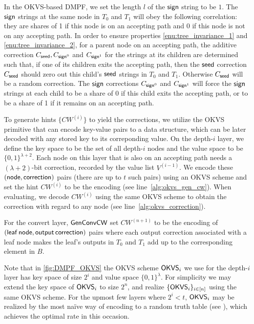 In the OKVS-based DMPF, we set the length $l$ of the ${\sf sign}$ string to be $1$. The ${\sf sign}$ strings at the same node in $T_0$ and $T_1$ will obey the following correlation: they are shares of 1 if this node is on an accepting path and 0 if this node is not on any accepting path. In order to ensure properties \ref{enu:tree_invariance_1} and \ref{enu:tree_invariance_2}, for a parent node on an accepting path, the additive correction $C_{\sf seed}, C_{{\sf sign}^0}$ and $C_{{\sf sign}^1}$ for the strings at its children are determined such that, if one of its children exits the accepting path, then the ${\sf seed}$ correction $C_{\sf seed}$ should zero out this child's ${\sf seed}$ strings in $T_0$ and $T_1$. Otherwise $C_{\sf seed}$ will be a random correction. The ${\sf sign}$ corrections $C_{{\sf sign}^0}$ and $C_{{\sf sign}^1}$ will force the ${\sf sign}$ strings at each child to be a share of 0 if this child exits the accepting path, or to be a share of 1 if it remains on an accepting path.  

To generate hints $\{CW^{(i)}\}$ to yield the corrections, we utilize the OKVS primitive that can encode key-value pairs to a data structure, which can be later decoded with any stored key to its correponding value. On the depth-$i$ layer, we define the key space to be the set of all depth-$i$ nodes and the value space to be $\{0,1\}^{\lambda+2}$. Each node on this layer that is also on an accepting path needs a $(\lambda+2)$-bit correction, recorded by the value list $V^{(i-1)}$. We encode these $\sf (node,correction)$ pairs (there are up to $t$ such pairs) using an OKVS scheme and set the hint $CW^{(i)}$ to be the encoding (see line~\ref{alg:okvs_gen_cw}). When evaluating, we decode $CW^{(i)}$ using the same OKVS scheme to obtain the correction with regard to any node (see line~\ref{alg:okvs_correction}). 

For the convert layer, $\sf GenConvCW$ set $CW^{(n+1)}$ to be the encoding of $\sf (leaf\,node, output\,correction)$ pairs where each output correction associated with a leaf node makes the leaf's outputs in $T_0$ and $T_1$ add up to the corresponding element in $B$. 

Note that in \cref{fig:DMPF_OKVS} the OKVS scheme ${\sf OKVS}_i$ we use for the depth-$i$ layer has key space of size $2^i$ and value space $\{0,1\}^\lambda$. For simplicity we may extend the key space of ${\sf OKVS}_i$ to size $2^n$, and realize $\{{\sf OKVS}_i\}_{i\in[n]}$ using the same OKVS scheme. For the upmost few layers where $2^i<t$, ${\sf OKVS}_i$ may be realized by the most na\"ive way of encoding to a random truth table (see ), which achieves the optimal rate in this occasion. 


